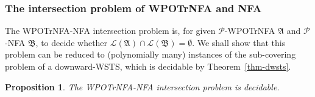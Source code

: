 \documentclass[preprint,12pt]{elsarticle}
\newtheorem{definition}{Definition}
\newtheorem{proposition}[theorem]{Proposition}
\newcommand\Aa{{\mathcal{A} }}
\newcommand\Pp{{\mathcal{P} }}
\newcommand\Aut{{\mathfrak{A} }}
\newcommand\AutB{{\mathfrak{B} }}
\newcommand\Lang{{\mathscr{L} }}
\newcommand\TranSet{{\mathscr{T} }}
\newcommand{\WOTrNFA}{\textsf{WPOTrNFA}}
\newcommand{\NFA}{\textsf{NFA}}
\begin{document}


\subsubsection{The intersection problem of {\WOTrNFA} and {\NFA}} \label{sec:fatrnfa}
The {\WOTrNFA}-{\NFA} intersection problem is, for given $\Pp$-{\WOTrNFA} $\Aut$ and $\Pp$-{\NFA} $\AutB$, to decide  whether $\Lang(\Aut) \cap \Lang(\AutB) = \emptyset$. We shall show that this problem %
can be reduced to (polynomially many) instances of the sub-covering problem of a downward-WSTS, which is decidable by Theorem~\ref{thm-dwsts}.

\begin{proposition}\label{prop-wstrnfa-nfa-intersect}
	The {\WOTrNFA}-{\NFA} intersection problem is decidable.
\end{proposition}






\end{document}

